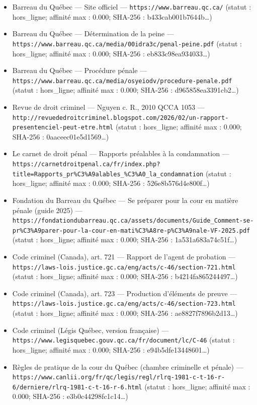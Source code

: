 \documentclass[12pt,a4paper]{article}
\begin{document}
\begin{itemize}[leftmargin=*]
\item Barreau du Québec — Site officiel — \texttt{https://www.barreau.qc.ca/} (statut : hors\_ligne; affinité max : 0.000; SHA-256 : b433cab001b7644b…)
\item Barreau du Québec — Détermination de la peine — \texttt{https://www.barreau.qc.ca/media/00idra3c/penal-peine.pdf} (statut : hors\_ligne; affinité max : 0.000; SHA-256 : eb833c98ea934033…)
\item Barreau du Québec — Procédure pénale — \texttt{https://www.barreau.qc.ca/media/osyeiodv/procedure-penale.pdf} (statut : hors\_ligne; affinité max : 0.000; SHA-256 : d965858ea3391cb2…)
\item Revue de droit criminel — Nguyen c. R., 2010 QCCA 1053 — \texttt{http://revuededroitcriminel.blogspot.com/2026/02/un-rapport-presentenciel-peut-etre.html} (statut : hors\_ligne; affinité max : 0.000; SHA-256 : 0aaceec01e5d1569…)
\item Le carnet de droit pénal — Rapports préalables à la condamnation — \texttt{https://carnetdroitpenal.ca/fr/index.php?title=Rapports\_pr\%C3\%A9alables\_\%C3\%A0\_la\_condamnation} (statut : hors\_ligne; affinité max : 0.000; SHA-256 : 526e8b576d4e800f…)
\item Fondation du Barreau du Québec — Se préparer pour la cour en matière pénale (guide 2025) — \texttt{https://fondationdubarreau.qc.ca/assets/documents/Guide\_Comment-se-pr\%C3\%A9parer-pour-la-cour-en-mati\%C3\%A8re-p\%C3\%A9nale-VF-2025.pdf} (statut : hors\_ligne; affinité max : 0.000; SHA-256 : 1a531a683a74c51f…)
\item Code criminel (Canada), art. 721 — Rapport de l'agent de probation — \texttt{https://laws-lois.justice.gc.ca/eng/acts/c-46/section-721.html} (statut : hors\_ligne; affinité max : 0.000; SHA-256 : b4214fa865244497…)
\item Code criminel (Canada), art. 723 — Production d'éléments de preuve — \texttt{https://laws-lois.justice.gc.ca/eng/acts/c-46/section-723.html} (statut : hors\_ligne; affinité max : 0.000; SHA-256 : ae8827f7896b2d13…)
\item Code criminel (Légis Québec, version française) — \texttt{https://www.legisquebec.gouv.qc.ca/fr/document/lc/C-46} (statut : hors\_ligne; affinité max : 0.000; SHA-256 : e94b5dfe13448601…)
\item Règles de pratique de la cour du Québec (chambre criminelle et pénale) — \texttt{https://www.canlii.org/fr/qc/legis/regl/rlrq-1981-c-t-16-r-6/derniere/rlrq-1981-c-t-16-r-6.html} (statut : hors\_ligne; affinité max : 0.000; SHA-256 : e3b0c44298fc1c14…)
\end{itemize}
\end{document}
